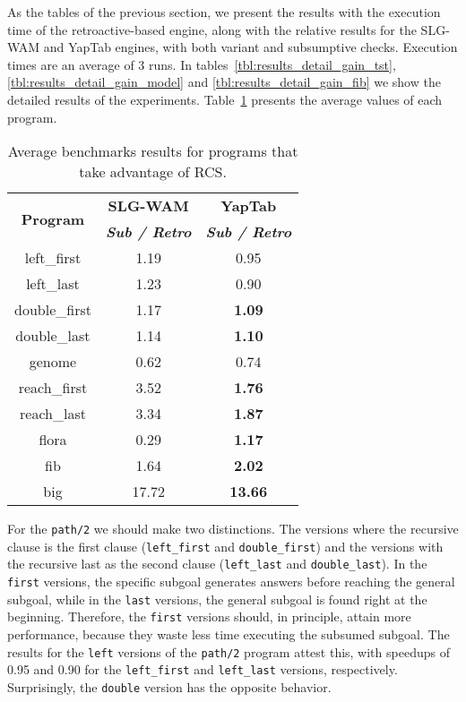 As the tables of the previous section, we present the results with the execution time of the retroactive-based
engine, along with the relative results for the SLG-WAM and YapTab engines, with both variant and subsumptive checks.
Execution times are an average of 3 runs.
In tables~\ref{tbl:results_detail_gain_tst}, \ref{tbl:results_detail_gain_model} and \ref{tbl:results_detail_gain_fib}
we show the detailed results of the experiments. Table~\ref{tbl:results_gain_overview} presents the average values of
each program.

\begin{table}[ht]
\centering
  \begin{tabular}{ccc}
   \hline
    \hline
    \multirow{2}{*}{\textbf{Program}} & \textbf{SLG-WAM} & \textbf{YapTab} \\
    & \textbf{\textit{\small{Sub / Retro}}} & \textbf{\textit{\small{Sub / Retro}}} \\
   \hline
   \hline
   
left\_first & 1.19 & 0.95 \\
left\_last & 1.23  & 0.90 \\
double\_first & 1.17 & \textbf{1.09} \\
double\_last & 1.14 & \textbf{1.10} \\
genome & 0.62 & 0.74 \\
reach\_first  & 3.52 & \textbf{1.76} \\
reach\_last  & 3.34 & \textbf{1.87} \\
flora & 0.29 & \textbf{1.17} \\
fib & 1.64 & \textbf{2.02} \\
big & 17.72 & \textbf{13.66} \\
\hline
\hline
\end{tabular}
\caption{Average benchmarks results for programs that take advantage of RCS.}
\label{tbl:results_gain_overview}
\end{table}

For the \texttt{path/2} we should make two distinctions. The versions where the recursive clause is the first
clause (\texttt{left\_first} and \texttt{double\_first}) and the versions with the recursive last as the second
clause (\texttt{left\_last} and \texttt{double\_last}). In the \texttt{first} versions, the specific subgoal
generates answers before reaching the general subgoal, while in the \texttt{last} versions, the general subgoal
is found right at the beginning. Therefore, the \texttt{first} versions should, in principle, attain more performance,
because they waste less time executing the subsumed subgoal. The results for the \texttt{left} versions of the
\texttt{path/2} program attest this, with speedups of 0.95 and 0.90 for the \texttt{left\_first} and
\texttt{left\_last} versions, respectively. Surprisingly, the \texttt{double} version has the opposite behavior.

